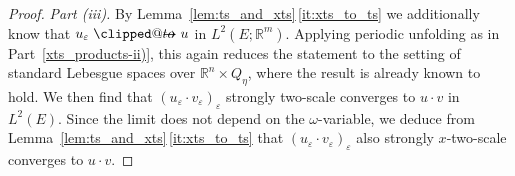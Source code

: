 \documentclass[reqno,11pt]{amsart}
\makeatletter
\numberwithin{equation}{section}
\theoremstyle{thmlemcorr}
\numberwithin{theorem}{section}
\theoremstyle{thmlemcorr*}
\theoremstyle{defi}
\theoremstyle{remexample}
\theoremstyle{ass}
\newcommand{\R}{\mathbb{R}}
\renewcommand{\epsilon}{\varepsilon}
\DeclarePairedDelimiter{\inner}{\langle}{\rangle}
\newcommand{\1}{\mathds{1}}
\DeclareRobustCommand{\twoscale}{%
  \clippedto\mathrel{\mspace{-15mu}}\to
}
\newcommand{\clippedto}{%
  \mathrel{\mathpalette\clipped@to\relax}%
}
\newcommand{\clipped@to}[2]{%
  \sbox\z@{$\m@th#1\mspace{6mu}$}%
  \clipbox{0pt 0pt {\dimexpr\width-.5\wd\z@} 0pt}{$\m@th#1\to$}%
  \smash{\clipbox{{\wd\z@} 0pt 0pt {-\width}}{$\m@th#1\to$}}%
}
\newcommand{\veps}{\varepsilon}
\newcommand{\dl}{\,\mathrm{d}}
\newcommand{\sequence}[2]{(#1_#2)_{#2}}
\newcommand{\comment}[1]{{\textcolor{red}{$\langle\hspace{-0.3ex}\langle$Leon: #1$\rangle\hspace{-0.3ex}\rangle$}}}
\newcommand{\hidde}[1]{{\textcolor{orange}{$\langle\hspace{-0.3ex}\langle$Hidde: #1$\rangle\hspace{-0.3ex}\rangle$}}}
\makeatother
\begin{document}
\begin{proof}

\textit{Part (iii).} By Lemma~\ref{lem:ts_and_xts}\,\ref{it:xts_to_ts} we additionally know that $u_\epsilon \twoscale u$ in $L^2(E; \R^m)$. Applying periodic unfolding as in Part~\ref{xts_products-ii)}, this again reduces the statement to the setting of standard Lebesgue spaces over \(\R^n\times Q_\eta\), where the result is already known to hold. 
We then find that $(u_\epsilon \cdot v_\epsilon)_\epsilon$ strongly two-scale converges to $u \cdot v$ in $L^2(E)$. Since the limit does not depend on the $\omega$-variable, we deduce from Lemma~\ref{lem:ts_and_xts}\,\ref{it:xts_to_ts} that $(u_\epsilon \cdot v_\epsilon)_\epsilon$ also strongly $x$-two-scale converges to $u \cdot v$.

\end{proof}
\end{document}
